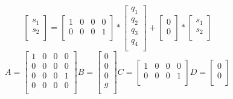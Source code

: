\documentclass{article}
\begin{document}
\begin{equation}
  	\begin{bmatrix}
 	s_{1} \\ 
  	s_{2} \\
  	\end{bmatrix}
  	=
  	\begin{bmatrix}
  	1 & 0 & 0 & 0 \\ 
  	0 & 0 & 0 & 1 \\
  	\end{bmatrix}
 	*
  	\begin{bmatrix}
  	q_{1} \\ 
  	q_{2} \\ 
  	q_{3} \\ 
 	q_{4} \\
  	\end{bmatrix}
  	+
  	\begin{bmatrix}
  	0 \\ 
  	0 \\
  	\end{bmatrix}
  	*
  	\begin{bmatrix}
  	s_{1} \\ 
  	s_{2} \\
  	\end{bmatrix}
\end{equation}
\begin{equation}
	A = 
  	\begin{bmatrix}
  	1 & 0 & 0 & 0 \\ 
  	0 & 0 & 0 & 0 \\
  	0 & 0 & 0 & 1 \\ 
  	0 & 0 & 0 & 0 \\
  	\end{bmatrix}
  	B = 
  	\begin{bmatrix}
  	0 \\ 
  	0 \\ 
  	0 \\ 
  	g \\
  	\end{bmatrix}
  	C =
  	\begin{bmatrix}
  	1 & 0 & 0 & 0 \\ 
  	0 & 0 & 0 & 1 \\
  	\end{bmatrix}
  	D = 
  	\begin{bmatrix}
  	0 \\ 
  	0 \\
  	\end{bmatrix}
\end{equation}
\end{document}

